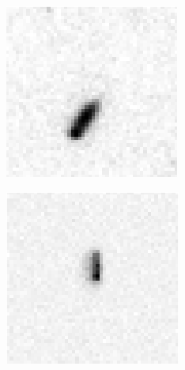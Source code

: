 \begin{figure}[!h]
\centering
    \begin{subfigure}[t]{.23\textwidth}
        \centering
        \includegraphics[width=\textwidth]{images/mwrongImage10.png}
        \caption{}
        \label{fig:galaxystreakmis2}
    \end{subfigure}
    \begin{subfigure}[t]{.23\textwidth}
        \centering
        \includegraphics[width=\textwidth]{images/mwrongImage2.png}

\end{subfigure}
\end{figure}
